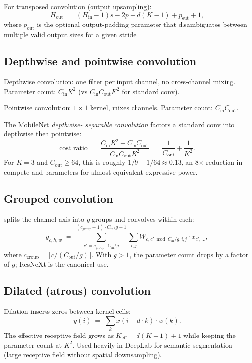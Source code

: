 For transposed convolution (output upsampling):
\[
  H_{\text{out}} \;=\; (H_{\text{in}} - 1) s - 2 p + d(K-1) + p_{\text{out}} + 1,
\]
where $p_{\text{out}}$ is the optional output-padding parameter
that disambiguates between multiple valid output sizes for a
given stride.

\subsection{Depthwise and pointwise convolution}
\label{ssec:linear_conv_norm:depthwise_pointwise}

Depthwise convolution: one filter per input channel, no
cross-channel mixing. Parameter count: $C_{\text{in}} K^2$ (vs
$C_{\text{in}} C_{\text{out}} K^2$ for standard conv).

Pointwise convolution: $1 \times 1$ kernel, mixes channels.
Parameter count: $C_{\text{in}} C_{\text{out}}$.

The MobileNet \cite{howard_mobilenet_2017} \emph{depthwise-
separable convolution} factors a standard conv into depthwise
then pointwise:
\[
  \text{cost ratio} \;=\;
  \frac{C_{\text{in}} K^2 + C_{\text{in}} C_{\text{out}}}{C_{\text{in}} C_{\text{out}} K^2}
  \;=\; \frac{1}{C_{\text{out}}} + \frac{1}{K^2}.
\]
For $K = 3$ and $C_{\text{out}} \geq 64$, this is roughly
$1/9 + 1/64 \approx 0.13$, an 8$\times$ reduction in compute
and parameters for almost-equivalent expressive power.

\subsection{Grouped convolution}
\label{ssec:linear_conv_norm:grouped_conv}

 splits the channel axis into $g$ groups
and convolves within each:
\[
  y_{c, h, w} \;=\;
  \sum_{c' = c_{\text{group}} \cdot C_{\text{in}}/g}^{(c_{\text{group}}+1) \cdot C_{\text{in}}/g - 1}
  \sum_{i, j} W_{c, c' \bmod C_{\text{in}}/g, i, j} \cdot x_{c', \ldots},
\]
where $c_{\text{group}} = \lfloor c / (C_{\text{out}}/g) \rfloor$.
With $g > 1$, the parameter count drops by a factor of $g$;
ResNeXt is the canonical use.

\subsection{Dilated (atrous) convolution}
\label{ssec:linear_conv_norm:dilated_conv}

Dilation inserts zeros between kernel cells:
\[
  y(i) \;=\; \sum_k x(i + d \cdot k) \cdot w(k).
\]
The effective receptive field grows as $K_{\text{eff}} = d(K-1) + 1$
while keeping the parameter count at $K^2$. Used heavily in
DeepLab \cite{chen_deeplab_2017} for semantic segmentation
(large receptive field without spatial downsampling).

